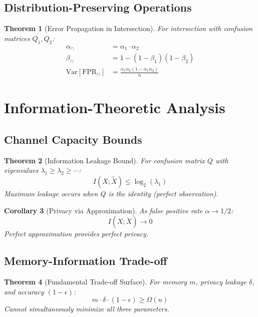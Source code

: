 \documentclass[11pt,final]{article}
\newcommand{\latent}[1]{#1}
\newcommand{\observed}[1]{\tilde{#1}}
\newcommand{\FPR}{\text{FPR}}
\newcommand{\Var}{\text{Var}}
\newtheorem{theorem}{Theorem}[section]
\newtheorem{corollary}[theorem]{Corollary}
\begin{document}
\subsection{Distribution-Preserving Operations}

\begin{theorem}[Error Propagation in Intersection]
For intersection with confusion matrices $Q_1, Q_2$:
\begin{align}
\alpha_{\cap} &= \alpha_1 \cdot \alpha_2 \\
\beta_{\cap} &= 1 - (1 - \beta_1)(1 - \beta_2) \\
\Var[\FPR_{\cap}] &= \frac{\alpha_1 \alpha_2(1 - \alpha_1\alpha_2)}{n}
\end{align}
\end{theorem}

\section{Information-Theoretic Analysis}

\subsection{Channel Capacity Bounds}

\begin{theorem}[Information Leakage Bound]
For confusion matrix $Q$ with eigenvalues $\lambda_1 \geq \lambda_2 \geq \cdots$:
\begin{equation}
I(\latent{X}; \observed{X}) \leq \log_2(\lambda_1)
\end{equation}
Maximum leakage occurs when $Q$ is the identity (perfect observation).
\end{theorem}

\begin{corollary}[Privacy via Approximation]
As false positive rate $\alpha \to 1/2$:
\begin{equation}
I(\latent{X}; \observed{X}) \to 0
\end{equation}
Perfect approximation provides perfect privacy.
\end{corollary}

\subsection{Memory-Information Trade-off}

\begin{theorem}[Fundamental Trade-off Surface]
For memory $m$, privacy leakage $\delta$, and accuracy $(1-\epsilon)$:
\begin{equation}
m \cdot \delta \cdot (1-\epsilon) \geq \Omega(n)
\end{equation}
Cannot simultaneously minimize all three parameters.
\end{theorem}
\end{document}
